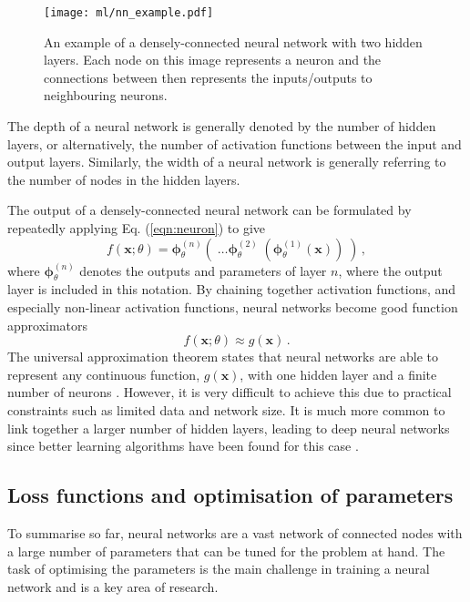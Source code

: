\documentclass[main.tex]{subfiles}
\begin{document}
    \begin{figure}
        \texttt{[image: ml/nn\_example.pdf]}
        \caption{An example of a densely-connected
        neural network with two hidden layers.
        Each node on this image represents
        a neuron and the connections between then
        represents the inputs/outputs to neighbouring neurons.}
        \label{fig:nn_example}
    \end{figure}

    The depth of a neural network
    is generally denoted by the number of hidden layers,
    or alternatively, the number of activation functions
    between the input and output layers. Similarly,
    the width of a neural network is generally referring
    to the number of nodes in the hidden layers.

    The output of a densely-connected neural network can
    be formulated by repeatedly applying Eq. (\ref{eqn:neuron})
    to give
    \begin{equation}\label{eqn:nn_output}
        f(\mathbf{x}; \theta) = \boldsymbol{\phi}^{(n)}_{\theta}(\; \ldots \boldsymbol{\phi}^{(2)}_{\theta}\; (\boldsymbol{\phi}^{(1)}_{\theta}(\mathbf{x}) ) \; ) \, ,
    \end{equation}
    where $\boldsymbol{\phi}^{(n)}_{\theta}$
    denotes the outputs and parameters of layer $n$,
    where the output layer is included in this notation.
    By chaining together activation functions, and especially
    non-linear activation functions, neural networks
    become good function approximators
    \begin{equation}\label{eqn:nn_approx}
        f(\mathbf{x}; \theta) \approx g(\mathbf{x}) \, .
    \end{equation}
    The universal approximation theorem states that neural networks are
    able to represent any continuous function, $g(\mathbf{x})$,
    with one hidden layer and a finite number of neurons \cite{HORNIK1991251}.
    However, it is very difficult to achieve this due to
    practical constraints such as limited data and network size.
    It is much more common to link
    together a larger number of hidden layers, leading
    to deep neural networks since better learning algorithms
    have been found for this case \cite{lu2017expressive}.
    
\subsection{Loss functions and optimisation of parameters}
    To summarise so far, neural networks are a vast network
    of connected nodes with a large number of parameters that
    can be tuned for the problem at hand.
    The task of optimising the parameters is the main challenge
    in training a neural network and is a key area of research.
\end{document}
